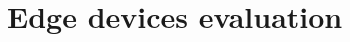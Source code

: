 \documentclass[../main.tex]{subfiles}
\begin{document}
\section{Edge devices evaluation}
\label{sec:edge_evaluation}
\end{document}

